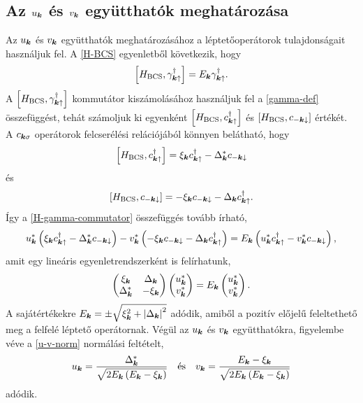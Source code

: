 \documentclass[a4paper,12pt,titlepage]{article}
\newcommand{\KK}{{\vb*{k}}}
\begin{document}
\subsection{Az $u_\KK$ és $v_\KK$ együtthatók meghatározása}

Az $u_\KK$ és $v_\KK$ együtthatók meghatározásához a léptetőoperátorok tulajdonságait használjuk fel.  A \eqref{H-BCS} egyenletből következik, hogy
\begin{equation} \label{H-gamma-commutator}
	\commutator{H_\text{BCS}}{\gamma_{\KK \uparrow}^\dagger} = E_\KK \gamma_{\KK \uparrow}^\dagger.
\end{equation}
A $\commutator{H_\text{BCS}}{\gamma_{\KK \uparrow}^\dagger}$ kommutátor kiszámolásához használjuk fel a \eqref{gamma-def} összefüggést, tehát számoljuk ki egyenként $\commutator{H_\text{BCS}}{c_{\KK \uparrow}^\dagger}$ és $\commutator{H_\text{BCS}}{c_{-\KK \downarrow}}$ értékét.  A $c_{\KK \sigma}$ operátorok felcserélési relációjából könnyen belátható, hogy
\begin{equation}
	\commutator{H_\text{BCS}}{c_{\KK \uparrow}^\dagger} = \xi_\KK c_{\KK \uparrow}^\dagger - \Delta_\KK^* c_{-\KK \downarrow}
\end{equation}
és
\begin{equation}
	\commutator{H_\text{BCS}}{c_{-\KK \downarrow}} = -\xi_\KK c_{-\KK \downarrow} - \Delta_\KK c_{\KK \uparrow}^\dagger.
\end{equation}
Így a \eqref{H-gamma-commutator} összefüggés tovább írható,
\begin{equation}
	u_\KK^* \left( \xi_\KK c_{\KK \uparrow}^\dagger - \Delta_\KK^* c_{-\KK \downarrow} \right) - v_\KK^* \left( -\xi_\KK c_{-\KK \downarrow} - \Delta_\KK c_{\KK \uparrow}^\dagger \right) = E_\KK \left( u_\KK^* c_{\KK \uparrow}^\dagger - v_\KK^* c_{-\KK \downarrow} \right),
\end{equation}
amit egy lineáris egyenletrendszerként is felírhatunk,
\begin{equation}
	\begin{pmatrix}
		\xi_\KK & \Delta_\KK \\
		\Delta_\KK^* & -\xi_\KK
	\end{pmatrix} \begin{pmatrix} u_\KK^* \\ v_\KK^* \end{pmatrix}
	= E_\KK \begin{pmatrix} u_\KK^* \\ v_\KK^* \end{pmatrix}.
\end{equation}
A sajátértékekre $E_\KK = \pm \sqrt{\xi_\KK^2 + \left| \Delta_\KK \right|^2}$ adódik, amiből a pozitív előjelű feleltethető meg a felfelé léptető operátornak.  Végül az $u_\KK$ és $v_\KK$ együtthatókra, figyelembe véve a \eqref{u-v-norm} normálási feltételt,
\begin{equation} \label{u-v-sc}
	u_\KK = \frac{\Delta_\KK^*}{\sqrt{2 E_\KK \left( E_\KK - \xi_\KK \right)}} ~~~ \text{és} ~~~ v_\KK = \frac{E_\KK - \xi_\KK}{\sqrt{2 E_\KK \left( E_\KK - \xi_\KK \right)}}
\end{equation}
adódik.
\end{document}
